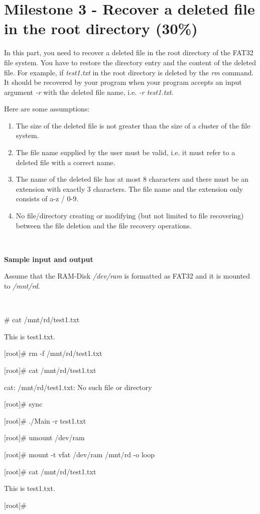 \documentclass[a4paper,12pt]{article}
\begin{document}
\section*{Milestone 3 - Recover a deleted file in the root directory (30\%)}

In this part, you need to recover a deleted file in the root directory of the FAT32 file system. You have to restore the directory entry and the content of the deleted file. For example, if \textit{test1.txt} in the root directory is deleted by the \textit{rm} command. It should be recovered by your program when your program accepts an input argument \textit{-r} with the deleted file name, i.e. \textit{-r test1.txt}.

Here are some assumptions:
\begin{enumerate}
  \addtolength{\itemsep}{-4mm}
    \item The size of the deleted file is not greater than the size of a cluster of the file system.
    \item The file name supplied by the user must be valid, i.e. it must refer to a deleted file with a correct name.
    \item The name of the deleted file has at most 8 characters and there must be an extension with exactly 3 characters. The file name and the extension only consists of a-z  / 0-9.
    \item No file/directory creating or modifying (but not limited to file recovering) between the file deletion and the file recovery operations.
\end{enumerate}

~

\noindent \textbf{Sample input and output}

Assume that the RAM-Disk \textit{/dev/ram} is formatted as FAT32 and it is mounted to \textit{/mnt/rd}.

~

\begin{tt}
[root]\# cat /mnt/rd/test1.txt

This is test1.txt.

[root]\# rm -f /mnt/rd/test1.txt

[root]\# cat /mnt/rd/test1.txt

cat: /mnt/rd/test1.txt: No such file or directory

[root]\# sync

[root]\# ./Main -r test1.txt

[root]\# umount /dev/ram

[root]\# mount -t vfat /dev/ram /mnt/rd -o loop

[root]\# cat /mnt/rd/test1.txt

This is test1.txt.

[root]\#

\end{tt}
\end{document}
